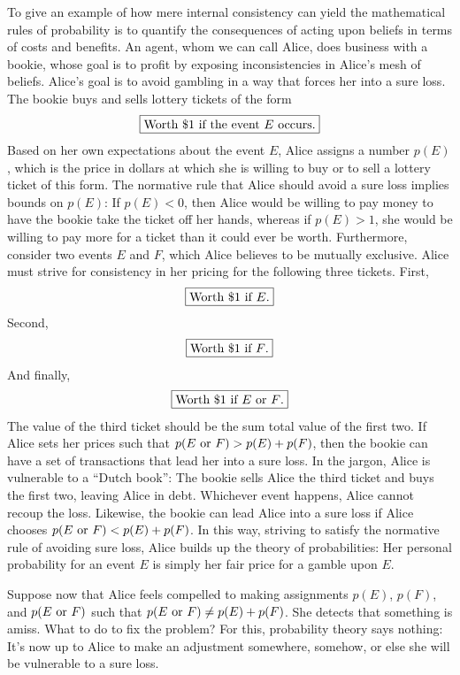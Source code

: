 \documentclass[aps,pra,superscriptaddress,12pt,tightenlines,nofootinbib]{revtex4-2}
\newcommand{\ticket}[1]{\boxed{\hbox{#1}}}
\begin{document}
To give an example of how mere internal consistency can yield the mathematical rules of probability is to quantify the consequences of acting upon beliefs in terms of costs and benefits.  An agent, whom we can call Alice, does business with a bookie, whose goal is to profit by exposing inconsistencies in Alice's mesh of beliefs.  Alice's goal is to avoid gambling in a way that forces her into a sure loss.  The bookie buys and sells lottery tickets of the form
\begin{equation}
\ticket{Worth \$1 if the event $E$ occurs.}
\end{equation}
Based on her own expectations about the event $E$, Alice assigns a number $p(E)$, which is the price in dollars at which she is willing to buy or to sell a lottery ticket of this form.  The normative rule that Alice should avoid a sure loss implies bounds on $p(E)$: If $p(E) < 0$, then Alice would be willing to pay money to have the bookie take the ticket off her hands, whereas if $p(E) > 1$, she would be willing to pay more for a ticket than it could ever be worth.  Furthermore, consider two events $E$ and $F$, which Alice believes to be mutually exclusive. Alice must strive for consistency in her pricing for the following three tickets.  First,
\begin{equation}
\ticket{Worth \$1 if $E$.}
\end{equation}
Second,
\begin{equation}
\ticket{Worth \$1 if $F$.}
\end{equation}
And finally,
\begin{equation}
\ticket{Worth \$1 if $E$ or $F$.}
\end{equation}
The value of the third ticket should be the sum total value of the first two.  If Alice sets her prices such that $p(E \hbox{ or } F) > p(E) + p(F)$, then the bookie can have a set of transactions that lead her into a sure loss.  In the jargon, Alice is vulnerable to a ``Dutch book'':  The bookie sells Alice the third ticket and buys the first two, leaving Alice in debt.  Whichever event happens, Alice cannot recoup the loss.  Likewise, the bookie can lead Alice into a sure loss if Alice chooses $p(E \hbox{ or } F) < p(E) + p(F)$.  In this way, striving to satisfy the normative rule of avoiding sure loss, Alice builds up the theory of probabilities:  Her personal probability for an event $E$ is simply her fair price for a gamble upon $E$.

Suppose now that Alice feels compelled to making assignments $p(E)$, $p(F)$, and $p(E \hbox{ or } F)$ such that $p(E \hbox{ or } F) \ne p(E) + p(F)$.  She detects that something is amiss. What to do to fix the problem?  For this, probability theory says nothing:  It's now up to Alice to make an adjustment somewhere, somehow, or else she will be vulnerable to a sure loss.
\end{document}
